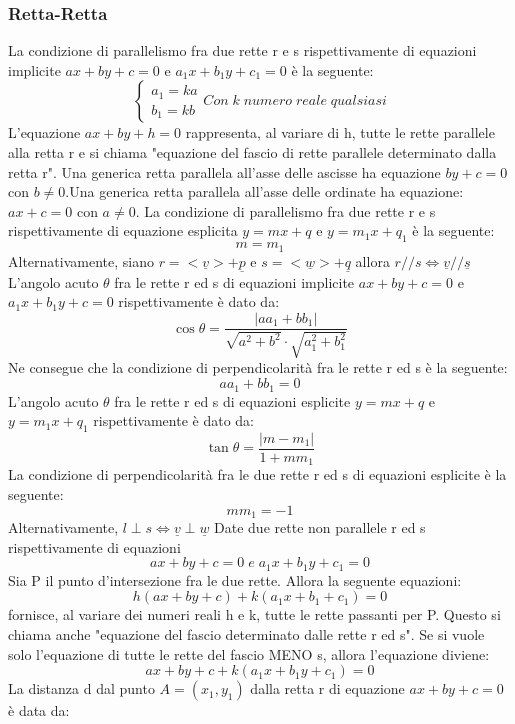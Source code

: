 \documentclass[12pt]{article}
\newenvironment{para}{\begin{adjustwidth}{13mm}{}}{\end{adjustwidth}}
\begin{document}
\begin{para}
\subsubsection{Retta-Retta}
La condizione di parallelismo fra due rette r e s rispettivamente di equazioni implicite $ax+by+c = 0$ e $a_1x+b_1y+c_1 = 0$ è la seguente: $$\begin{cases}
    a_1 = ka \\
    b_1 = kb
\end{cases} Con \; k \; numero \; reale \; qualsiasi$$
L'equazione $ax +by +h = 0$ rappresenta, al variare di h, tutte le rette parallele alla retta r e si chiama "equazione del fascio di rette parallele determinato dalla retta r". Una generica retta parallela all'asse delle ascisse ha equazione $by+c = 0$ con $b \neq 0$.\newline Una generica retta parallela all'asse delle ordinate ha equazione: $ax+c = 0$ con $a \neq 0$. La condizione di parallelismo fra due rette r e s rispettivamente di equazione esplicita $y = mx + q$ e $y = m_1x+q_1$ è la seguente: $$m = m_1$$
Alternativamente, siano $r = <\underline{v}> + \underline{p}$ e $s = <\underline{w}>+\underline{q}$ allora $r // s \Leftrightarrow \underline{v} // \underline{s}$ \newline
L'angolo acuto $\theta$ fra le rette r ed s di equazioni implicite $ax+by+c = 0$ e $a_1x+b_1y+c = 0$ rispettivamente è dato da: $$\cos{\theta} = \frac{|aa_1+bb_1|}{\sqrt{a^2+b^2}\cdot\sqrt{a_1^2+b_1^2}}$$
Ne consegue che la condizione di perpendicolarità fra le rette r ed s è la seguente:
$$aa_1+bb_1 = 0$$
L'angolo acuto $\theta$ fra le rette r ed s di equazioni esplicite $y = mx+q$ e $y = m_1x+q_1$ rispettivamente è dato da:
$$\tan{\theta} = \frac{|m-m_1|}{1+mm_1}$$
La condizione di perpendicolarità fra le due rette r ed s di equazioni esplicite è la seguente: $$mm_1 = -1$$ Alternativamente, $l \perp s \Leftrightarrow \underline{v} \perp \underline{w}$ \newline
Date due rette non parallele r ed s rispettivamente di equazioni $$ax+by+c = 0 \; e \; a_1x+b_1y+c_1=0$$ Sia P il punto d'intersezione fra le due rette. Allora la seguente equazioni: $$h(ax+by+c)+k(a_1x+b_1+c_1)=0$$ fornisce, al variare dei numeri reali h e k, tutte le rette passanti per P. Questo si chiama anche "equazione del fascio determinato dalle rette r ed s". Se si vuole solo l'equazione di tutte le rette del fascio MENO s, allora l'equazione diviene:
$$ax+by+c + k(a_1x+b_1y+c_1)=0$$
La distanza d dal punto $A = (x_1, y_1)$ dalla retta r di equazione $ax+by+c=0$ è data da:

\end{para}
\end{document}
